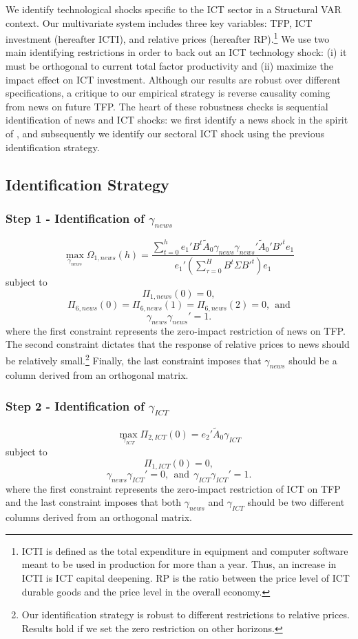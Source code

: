 \documentclass[a0,landscape]{a0poster}
\begin{document}
\begin{multicols}{4}
We identify technological shocks specific to the ICT sector in a Structural VAR context. Our multivariate system includes three key variables: TFP, ICT investment (hereafter ICTI), and relative prices (hereafter RP).\footnote{ICTI is defined as the total expenditure in equipment and computer software meant to be used in production for more than a year. Thus, an increase in ICTI is ICT capital deepening. RP is the ratio between the price level of ICT durable goods and the price level in the overall economy.} We use two main identifying restrictions in order to back out an ICT technology shock: (i) it must be orthogonal to current total factor productivity and (ii) maximize the impact effect on ICT investment. Although our results are robust over different specifications, a critique to our empirical strategy is reverse causality coming from news on future TFP. The heart of these robustness checks is sequential identification of news and ICT shocks: we first identify a news shock in the spirit of \cite{barsky2011news}, and subsequently we identify our sectoral ICT shock using the previous identification strategy.


\subsection*{Identification Strategy}
\subsubsection*{Step 1 - Identification of $\gamma_{news}$}
$$
\max_{\gamma_{news}} \Omega_{1,news}(h) = \frac{ \sum_{t=0}^h e_1' B^t \tilde{A}_0 \gamma_{news} \gamma_{news}' \tilde{A}_0' B'^t e_1 } {e_1' ( \sum_{\tau = 0}^H B^t \Sigma B'^t )e_1}
$$
subject to
$$
\Pi_{1,news}(0) = 0,
$$
$$
\Pi_{6,news}(0) = \Pi_{6,news}(1) = \Pi_{6,news}(2) = 0, \ \ \text{and}
$$
$$
\gamma_{news} \gamma_{news}' = 1.
$$
where the first constraint represents the zero-impact restriction of news on TFP. The second constraint dictates that the response of relative prices to news should be relatively small.\footnote{Our identification strategy is robust to different restrictions to relative prices. Results hold if we set the zero restriction on other horizons.} Finally, the last constraint imposes that $\gamma_{news}$ should be a column derived from an orthogonal matrix. 


\subsubsection*{Step 2 - Identification of $\gamma_{ICT}$}
$$
\max_{\gamma_{ICT}} \Pi_{2,ICT}(0) =  e_2' \tilde{A}_0 \gamma_{ICT} 
$$
subject to
$$
\Pi_{1,ICT}(0) = 0,
$$
$$
\gamma_{news} \gamma_{ICT}' = 0, \ \ \text{and} \ \ \gamma_{ICT} \gamma_{ICT}' = 1.
$$
where the first constraint represents the zero-impact restriction of ICT on TFP and the last constraint imposes that both $\gamma_{news}$ and $\gamma_{ICT}$ should be two different columns derived from an orthogonal matrix.



\end{multicols}
\end{document}
